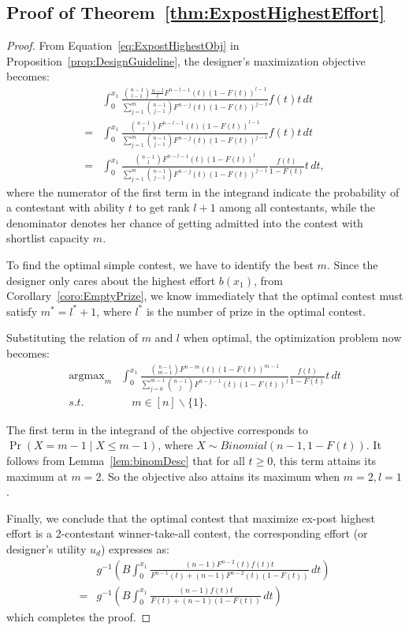 \subsection*{Proof of Theorem~\ref{thm:ExpostHighestEffort}}
\begin{proof}
    From Equation~\ref{eq:ExpostHighestObj} in Proposition~\ref{prop:DesignGuideline}, the designer's maximization objective becomes:
    \[
    \begin{aligned}
        & \int_{0}^{x_{1}}\frac{\binom{n-1}{l-1}\frac{n-l}{l}F^{n-l-1}(t)(1-F(t))^{l-1}}{\sum_{j=1}^{m}\binom{n-1}{j-1}F^{n-j}(t)(1-F(t))^{j-1}}f(t) t \, dt \\
        = & \int_{0}^{x_{1}}\frac{\binom{n-1}{l}F^{n-l-1}(t)(1-F(t))^{l-1}}{\sum_{j=1}^{m}\binom{n-1}{j-1}F^{n-j}(t)(1-F(t))^{j-1}}f(t) t \, dt \\
        = & \int_{0}^{x_{1}}\frac{\binom{n-1}{l}F^{n-l-1}(t)(1-F(t))^{l}}{\sum_{j=1}^{m}\binom{n-1}{j-1}F^{n-j}(t)(1-F(t))^{j-1}} \frac{f(t)}{1-F(t)} t \, dt,
    \end{aligned}
    \]
    where the numerator of the first term in the integrand indicate the probability of a contestant with ability $t$ to get rank $l+1$ among all contestants, while the denominator denotes her chance of getting admitted into the contest with shortlist capacity $m$.

    To find the optimal simple contest, we have to identify the best $m$. Since the designer only cares about the highest effort $b(x_1)$, from Corollary~\ref{coro:EmptyPrize}, we know immediately that the optimal contest must satisfy $m^*=l^{*}+1$, where $l^*$ is the number of prize in the optimal contest.

    Substituting the relation of $m$ and $l$ when optimal, the optimization problem now becomes:
    \[
    \begin{aligned}
         \mathop{\arg \max}_{m} &  \int_{0}^{x_{1}}\frac{\binom{n-1}{m-1}F^{n-m}(t)(1-F(t))^{m-1}}{\sum_{j=0}^{m-1}\binom{n-1}{j}F^{n-j-1}(t)(1-F(t))^{j}}\frac{f(t)}{1-F(t)} t \, dt \\
        s.t. & \quad m \in [n]\backslash\{1\}.
    \end{aligned}
    \]

    The first term in the integrand of the objective corresponds to $\Pr(X=m-1\mid X \leq m-1)$, where $X\sim Binomial(n-1,1-F(t))$. It follows from Lemma~\ref{lem:binomDesc} that for all $t \geq0$, this term attains its maximum at $m=2$. So the objective also attains its maximum when $m=2,l=1$.

    Finally, we conclude that the optimal contest that maximize ex-post highest effort is a 2-contestant winner-take-all contest, the corresponding effort (or designer's utility $u_d$) expresses as: 
    $$
    \begin{aligned}
        & g^{-1}\left ( B \int_{0}^{x_{1}} \frac{(n-1)F^{n-2}(t)f(t)t}{F^{n-1}(t)+(n-1)F^{n-2}(t)(1-F(t))} \, dt \right ) \\
        = & g^{-1}\left ( B \int_{0}^{x_{1}} \frac{(n-1)f(t)t}{F(t)+(n-1)(1-F(t))} \, dt \right )
    \end{aligned}
    $$
    which completes the proof.
\end{proof}


